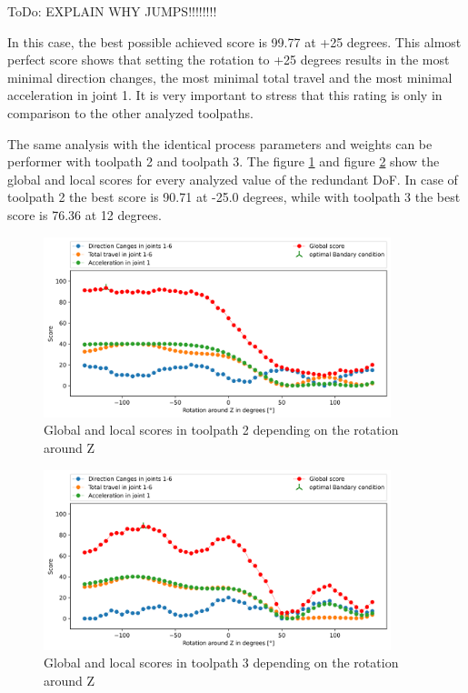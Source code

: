ToDo: EXPLAIN WHY JUMPS!!!!!!!!\newline

In this case, the best possible achieved score is 99.77 at +25 degrees. This almost perfect score shows that setting the rotation to +25 degrees results in the most minimal direction changes, the most minimal total travel and the most minimal acceleration in joint 1. It is very important to stress that this rating is only in comparison to the other analyzed toolpaths.

The same analysis with the identical process parameters and weights can be performer with toolpath 2 and toolpath 3. The figure \ref{TP2_combi} and figure \ref{TP3_combi} show the global and local scores for every analyzed value of the redundant DoF. In case of toolpath 2 the best score is 90.71 at -25.0 degrees, while with toolpath 3 the best score is 76.36 at 12 degrees.



\begin{figure}[H]
\centerline{\includegraphics[width=0.9\textwidth]{figures/best_c_2_combi.png}}
\caption{Global and local scores in toolpath 2 depending on the rotation around Z}
\label{TP2_combi}
\end{figure}
\begin{figure}[H]
\centerline{\includegraphics[width=0.9\textwidth]{figures/best_c_3_combi.png}}
\caption{Global and local scores in toolpath 3 depending on the rotation around Z}
\label{TP3_combi}
\end{figure}

